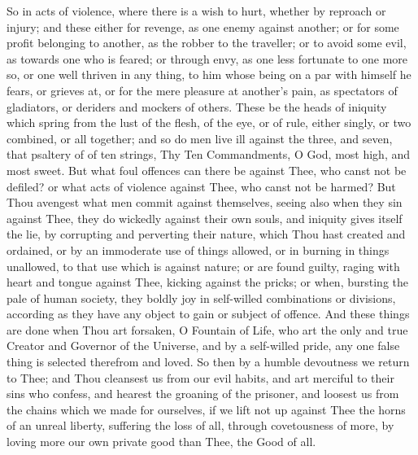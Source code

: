 \documentclass[b5paper,openright,12pt,twoside]{book}
\begin{document}
So in acts of violence, where there is a wish to hurt, whether by
reproach or injury; and these either for revenge, as one enemy against
another; or for some profit belonging to another, as the robber to
the traveller; or to avoid some evil, as towards one who is feared; or
through envy, as one less fortunate to one more so, or one well thriven
in any thing, to him whose being on a par with himself he fears, or
grieves at, or for the mere pleasure at another's pain, as spectators
of gladiators, or deriders and mockers of others. These be the heads
of iniquity which spring from the lust of the flesh, of the eye, or of
rule, either singly, or two combined, or all together; and so do men
live ill against the three, and seven, that psaltery of of ten strings,
Thy Ten Commandments, O God, most high, and most sweet. But what foul
offences can there be against Thee, who canst not be defiled? or
what acts of violence against Thee, who canst not be harmed? But Thou
avengest what men commit against themselves, seeing also when they sin
against Thee, they do wickedly against their own souls, and iniquity
gives itself the lie, by corrupting and perverting their nature, which
Thou hast created and ordained, or by an immoderate use of things
allowed, or in burning in things unallowed, to that use which is against
nature; or are found guilty, raging with heart and tongue against Thee,
kicking against the pricks; or when, bursting the pale of human society,
they boldly joy in self-willed combinations or divisions, according as
they have any object to gain or subject of offence. And these things are
done when Thou art forsaken, O Fountain of Life, who art the only and
true Creator and Governor of the Universe, and by a self-willed pride,
any one false thing is selected therefrom and loved. So then by a
humble devoutness we return to Thee; and Thou cleansest us from our
evil habits, and art merciful to their sins who confess, and hearest the
groaning of the prisoner, and loosest us from the chains which we made
for ourselves, if we lift not up against Thee the horns of an unreal
liberty, suffering the loss of all, through covetousness of more, by
loving more our own private good than Thee, the Good of all.
\end{document}
